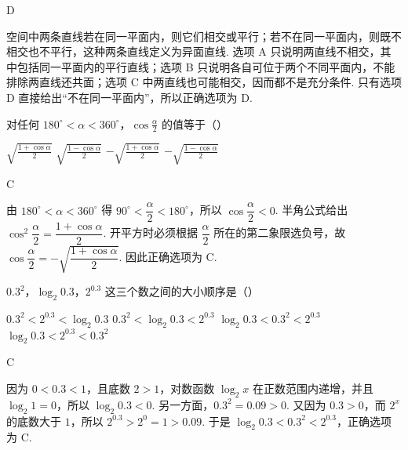 \documentclass[UTF8,a4paper,oneside,11pt]{ctexbook}
\begin{document}
\begin{answer}
D
\end{answer}

\begin{solution}
空间中两条直线若在同一平面内，则它们相交或平行；若不在同一平面内，则既不相交也不平行，这种两条直线定义为异面直线. 选项 A 只说明两直线不相交，其中包括同一平面内的平行直线；选项 B 只说明各自可位于两个不同平面内，不能排除两直线还共面；选项 C 中两直线也可能相交，因而都不是充分条件. 只有选项 D 直接给出“不在同一平面内”，所以正确选项为 D.
\end{solution}

\begin{problem}
对任何 \(180^{\circ} < \alpha < 360^{\circ}\)，\(\cos \frac{\alpha}{2}\) 的值等于（\quad）

\choices
    {\(\sqrt{\frac{1 + \cos\alpha}{2}}\)}
    {\(\sqrt{\frac{1 - \cos\alpha}{2}}\)}
    {\(-\sqrt{\frac{1 + \cos\alpha}{2}}\)}
    {\(-\sqrt{\frac{1 - \cos\alpha}{2}}\)}
\end{problem}

\begin{answer}
C
\end{answer}

\begin{solution}
由 \(180^{\circ}<\alpha<360^{\circ}\) 得 \(90^{\circ}<\dfrac{\alpha}{2}<180^{\circ}\)，所以 \(\cos\dfrac{\alpha}{2}<0\). 半角公式给出 \(\cos^2\dfrac{\alpha}{2}=\dfrac{1+\cos\alpha}{2}\). 开平方时必须根据 \(\dfrac{\alpha}{2}\) 所在的第二象限选负号，故 \(\cos\dfrac{\alpha}{2}=-\sqrt{\dfrac{1+\cos\alpha}{2}}\). 因此正确选项为 C.
\end{solution}

\begin{problem}
\(0.3^{2}\)，\(\log_{2}0.3\)，\(2^{0.3}\) 这三个数之间的大小顺序是（\quad）

\choices
    {\(0.3^{2} < 2^{0.3} < \log_{2}0.3\)}
    {\(0.3^{2} < \log_{2}0.3 < 2^{0.3}\)}
    {\(\log_{2}0.3 < 0.3^{2} < 2^{0.3}\)}
    {\(\log_{2}0.3 < 2^{0.3} < 0.3^{2}\)}
\end{problem}

\begin{answer}
C
\end{answer}

\begin{solution}
因为 \(0<0.3<1\)，且底数 \(2>1\)，对数函数 \(\log_2 x\) 在正数范围内递增，并且 \(\log_2 1=0\)，所以 \(\log_2 0.3<0\). 另一方面，\(0.3^2=0.09>0\). 又因为 \(0.3>0\)，而 \(2^x\) 的底数大于 \(1\)，所以 \(2^{0.3}>2^0=1>0.09\). 于是 \(\log_2 0.3<0.3^2<2^{0.3}\)，正确选项为 C.
\end{solution}
\end{document}

